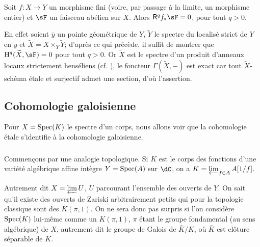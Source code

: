 \begin{proposition}\label{I:2-3-6}
Soit $f:X\to Y$ un morphisme fini (voire, par passage à la limite, un 
morphisme entier) et $\sF$ un faisceau abélien sur $X$. Alors $\R^q f_* \sF=0$, 
pour tout $q>0$.
\end{proposition}

En effet soient $\bar y$ un pointe géométrique de $Y$, $\widetilde Y$ le 
spectre du localisé strict de $Y$ en $y$ et 
$\widetilde X=X\times_Y \widetilde Y$; d'après ce qui précède, il suffit de 
montrer que $\h^q(\widetilde X,\sF) = 0$ pour tout $q>0$. Or $\widetilde X$ est le 
spectre d'un produit d'anneaux locaux strictement henséliens (cf. 
\cite[I]{ra70}), le foncteur $\Gamma(\widetilde X,-)$ est exact car tout 
$\widetilde X$-schéma étale et surjectif admet une section, d'où l'assertion. 










\subsection{Cohomologie galoisienne}\label{I:2-4}

Pour $X=\operatorname{Spec}(K)$ le spectre d'un corps, nous allons voir que la cohomologie 
étale s'identifie à la cohomologie galoisienne. 





\subsubsection{}\label{I:2-4-1}

Commençons par une analogie topologique. Si $K$ est le corps des fonctions 
d'une variété algébrique affine intègre $Y=\operatorname{Spec}(A)$ sur $\dC$, on a 
$K=\varprojlim_{f\in A} A[1/f]$. 

Autrement dit $X=\varprojlim U$, $U$ parcourant l'ensemble des ouverts de $Y$. 
On sait qu'il existe des ouverts de Zariski arbitrairement petits qui pour la 
topologie classique sont des $K(\pi,1)$. On ne sera donc pas surpris si l'on 
considère $\operatorname{Spec}(K)$ lui-même comme un $K(\pi,1)$, $\pi$ étant le groupe 
fondamental (au sens algébrique) de $X$, autrement dit le groupe de Galois de 
$\bar K/K$, où $\bar K$ est clôture séparable de $K$. 





\subsubsection{}\label{I:2-4-2}

